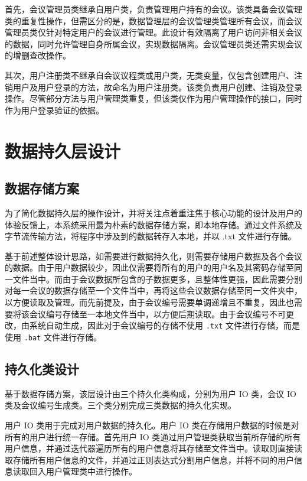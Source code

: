 \documentclass[a4paper, twoside, utf8]{ctexart}
\begin{document}
    首先，会议管理员类继承自用户类，负责管理用户持有的会议。该类具备会议管理类的重复性操作，但需区分的是，数据管理层的会议管理类管理所有会议，而会议管理员类仅针对特定用户的会议进行管理。此设计有效隔离了用户访问非相关会议的数据，同时允许管理自身所属会议，实现数据隔离。会议管理员类还需实现会议的增删查改操作。
    
    其次，用户注册类不继承自会议议程类或用户类，无类变量，仅包含创建用户、注销用户及用户登录的方法，故命名为用户注册类。该类负责用户创建、注销及登录操作。尽管部分方法与用户管理类重复，但该类仅作为用户管理操作的接口，同时作为用户登录验证的依据。
    
    \section{数据持久层设计}
    
    \subsection{数据存储方案}
    
    为了简化数据持久层的操作设计，并将关注点着重注焦于核心功能的设计及用户的体验反馈上，本系统采用最为朴素的数据存储方案，即本地存储。通过文件系统及字节流传输方法，将程序中涉及到的数据转存入本地，并以 .txt 文件进行存储。
    
    基于前述整体设计思路，如需要进行数据持久化，则需要存储用户数据及各个会议的数据。由于用户数据较少，因此仅需要将所有的用户的用户名及其密码存储至同一文件当中。而由于会议数据所包含的子数据更多，且整体性更强，因此需要分别对每一会议的数据存储至一个文件当中，再将这些会议数据存储至同一文件夹中，以方便读取及管理。而先前提及，由于会议编号需要单调递增且不重复，因此也需要将该会议编号存储至一本地文件当中，以方便后期读取。由于会议编号不可更改，由系统自动生成，因此对于会议编号的存储不使用 \verb|.txt| 文件进行存储，而是使用 \verb|.bat| 文件进行存储。
    
    \subsection{持久化类设计}
    
    基于数据存储方案，该层设计由三个持久化类构成，分别为用户 IO 类，会议 IO 类及会议编号生成类。三个类分别完成三类数据的持久化实现。
    
    用户 IO 类用于完成对用户数据的持久化。用户 IO 类在存储用户数据的时候是对所有的用户进行统一存储。首先用户 IO 类通过用户管理类获取当前所存储的所有用户信息，并通过迭代器遍历所有的用户信息将其存储至文件当中。读取则直接读取存储所有用户信息的文件，并通过正则表达式分割用户信息，并将不同的用户信息读取回入用户管理类中进行操作。
    
\end{document}

